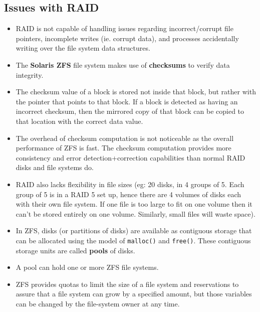 \documentclass{article}
\theoremstyle{plain}
\theoremstyle{definition}
\begin{document}
\subsection{Issues with RAID}
\begin{itemize}
    \item RAID is not capable of handling issues regarding incorrect/corrupt file pointers, incomplete writes (ie. corrupt data), and processes accidentally writing over the file system
    data structures.
    
    \item The \textbf{Solaris ZFS} file system makes use of \textbf{checksums} to verify data integrity. 
    
    \item The checksum value of a block is stored not inside that block, but rather with the pointer that points to that block. If a block is detected as having an incorrect checksum, then the mirrored copy of that block can be copied to that location with the correct data value.
    
    \item The overhead of checksum computation is not noticeable as the overall performance of ZFS is fast. The checksum computation provides more consistency and error detection+correction capabilities than normal RAID disks and file systems do. 
    
    \item RAID also lacks flexibility in file sizes (eg: 20 disks, in 4 groups of 5. Each group of 5 is in a RAID 5 set up, hence there are 4 volumes of disks each with their own file system. If one file is too large to fit on one volume then it can't be stored entirely on one volume. Similarly, small files will waste space). 
    
    \item In ZFS, disks (or partitions of disks) are available as contiguous storage that can be allocated using the model of \texttt{malloc()} and \texttt{free()}. These contiguous storage units are called \textbf{pools} of disks. 
    
    \item A pool can hold one or more ZFS file systems. 
    
    \item ZFS provides quotas to limit the size of a file system and reservations to assure that a file system can grow by a specified amount, but those variables can be changed by the file-system owner at any time.
\end{itemize}
\end{document}
